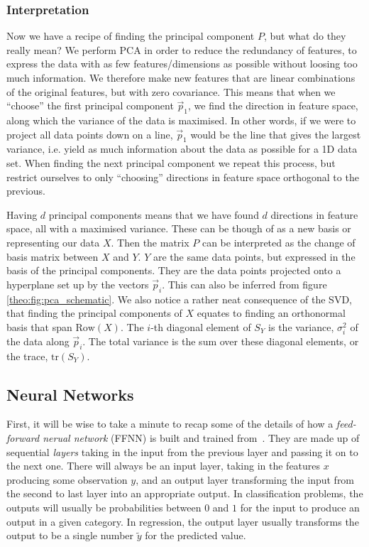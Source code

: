    \subsubsection{Interpretation}
    Now we have a recipe of finding the principal component $P$, but what do they really mean? We perform PCA in order to reduce the redundancy of features, to express the data with as few features/dimensions as possible without loosing too much information. We therefore make new features that are linear combinations of the original features, but with zero covariance. This means that when we ``choose'' the first principal component $\vec{p}_1$, we find the direction in feature space, along which the variance of the data is maximised. In other words, if we were to project all data points down on a line, $\vec{p}_1$ would be the line that gives the largest variance, i.e. yield as much information about the data as possible for a 1D data set. When finding the next principal component we repeat this process, but restrict ourselves to only ``choosing'' directions in feature space orthogonal to the previous. 
    
    Having $d$ principal components means that we have found $d$ directions in feature space, all with a maximised variance. These can be though of as a new basis or representing our data $X$. Then the matrix $P$ can be interpreted as the change of basis matrix between $X$ and $Y$. $Y$ are the same data points, but expressed in the basis of the principal components. They are the data points projected onto a hyperplane set up by the vectors $\vec{p}_i$. This can also be inferred from figure \ref{theo:fig:pca_schematic}. We also notice a rather neat consequence of the SVD, that finding the principal components of $X$ equates to finding an orthonormal basis that span $\text{Row}(X)$. The $i$-th diagonal element of $S_Y$ is the variance, $\sigma_i^2$ of the data along $\vec{p}_i$. The total variance is the sum over these diagonal elements, or the trace, $\text{tr}(S_Y)$.

     

\subsection{Neural Networks}
    First, it will be wise to take a minute to recap some of the details of how a \textit{feed-forward nerual network} (FFNN) is built and trained from~\cite{Project2}. They are made up of sequential \textit{layers} taking in the input from the previous layer and passing it on to the next one. There will always be an input layer, taking in the features $x$ producing some observation $y$, and an output layer transforming the input from the second to last layer into an appropriate output. In classification problems, the outputs will usually be probabilities between $0$ and $1$ for the input to produce an output in a given category. In regression, the output layer usually transforms the output to be a single number $\tilde{y}$ for the predicted value.

